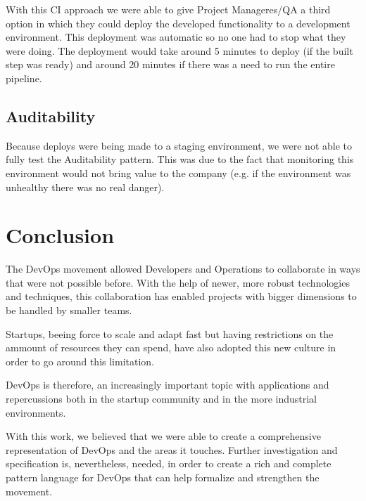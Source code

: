 \documentclass{llncs}
\begin{document}
   With this CI approach we were able to give Project Manageres/QA a third option in which they could deploy the developed functionality to a development environment. This deployment was automatic so no one had to stop what they were doing. The deployment would take around 5 minutes to deploy (if the built step was ready) and around 20 minutes if there was a need to run the entire pipeline.

  \subsection{Auditability}

  Because deploys were being made to a staging environment, we were not able to fully test the Auditability pattern. This was due to the fact that monitoring this environment would not bring value to the company (e.g. if the environment was unhealthy there was no real danger).

\section{Conclusion}
	The DevOps movement allowed Developers and Operations to collaborate in ways that were not possible before. With the help of newer, more robust technologies and techniques, this collaboration has enabled projects with bigger dimensions to be handled by smaller teams.

  Startups, beeing force to scale and adapt fast but having restrictions on the ammount of resources they can spend, have also adopted this new culture in order to go around this limitation.

  DevOps is therefore, an increasingly important topic with applications and repercussions both in the startup community and in the more industrial environments.

  With this work, we believed that we were able to create a comprehensive representation of DevOps and the areas it touches. Further investigation and specification is, nevertheless, needed, in order to create a rich and complete pattern language for DevOps that can help formalize and strengthen the movement.


\end{document}
